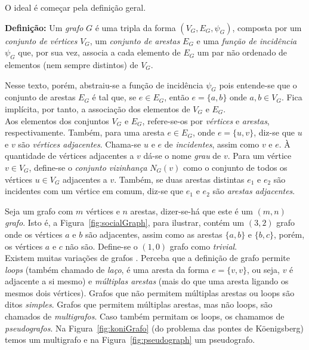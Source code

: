 O ideal é começar pela definição geral.

\begin{center}
	\begin{minipage}{0.9 \linewidth}
		\textbf{Definição:} Um \textit{grafo} $G$ é uma tripla da forma $(V_G,E_G, \psi_{G})$, composta por um \textit{conjunto de vértices} $V_G$, um \textit{conjunto de arestas} $E_G$ e uma \textit{função de incidência} $\psi_{G}$ que, por sua vez, associa a cada elemento de $E_G$ um par não ordenado de elementos (nem sempre distintos) de $V_G$.
	\end{minipage}
\end{center} 

Nesse texto, porém, abstraiu-se a função de incidência $\psi_G$ pois entende-se que o conjunto de arestas $E_G$ é tal que, se $e \in E_G$, então $e = \{a, b\}$ onde $a, b \in V_G$. Fica implícita, por tanto, a associação dos elementos de  $V_G$ e $E_G$.
\\

Aos elementos dos conjuntos $V_G$ e $E_G$, refere-se-os por \textit{vértices} e \textit{arestas}, respectivamente. Também, para uma aresta $e \in E_G$, onde $e = \{u, v\}$, diz-se que $u$ e $v$ são \textit{vértices adjacentes}. Chama-se $u$ e $e$ de \textit{incidentes}, assim como $v$ e $e$. À quantidade de vértices adjacentes a $v$ dá-se o nome \textit{grau} de $v$. Para um vértice $v\in V_G$, define-se o \textit{conjunto vizinhança} $N_G(v)$ como o conjunto de todos os vértices $u\in V_G$ adjacentes a $v$. Também, se duas arestas distintas $e_1$ e $e_2$ são incidentes com um vértice em comum, diz-se que $e_1$ e $e_2$ são \textit{arestas adjacentes}. 

Seja um grafo com $m$ vértices e $n$ arestas, dizer-se-há que este é um $(m, n)$ \textit{grafo}. Isto é, a Figura~\ref{fig:socialGraph}, para ilustrar, contém um $(3,2)$ grafo onde os vértices $a$ e $b$ são adjacentes, assim como as arestas $\{a, b\}$ e $\{b, c\}$, porém, os vértices $a$ e $c$ não são.
Define-se o $(1,0)$ grafo como \textit{trivial}.
\\

Existem muitas variações de grafos \cite{graphTheoryFHarary}. Perceba que a definição de grafo permite \textit{loops} (também chamado de \textit{laço}, é uma aresta da forma $e = \{v,v\}$, ou seja, $v$ é adjacente a si mesmo) e \textit{múltiplas arestas} (mais do que uma aresta ligando os mesmos dois vértices). Grafos que não permitem múltiplas arestas ou loops são ditos \textit{simples}. Grafos que permitem múltiplas arestas, mas não loops, são chamados de \textit{multigrafos}. Caso também permitam os loops, os chamamos de \textit{pseudografos}. Na Figura~\ref{fig:koniGrafo} (do problema das pontes de Köenigsberg) temos um multigrafo e na Figura~\ref{fig:pseudograph} um pseudografo.

